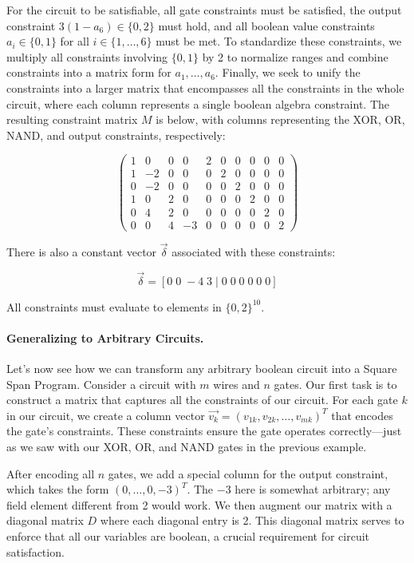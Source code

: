 \documentclass[12pt]{tufte-book}
\begin{document}
For the circuit to be satisfiable, all gate constraints must be satisfied, the output constraint $3(1 - a_6) \in \{0, 2\}$ must hold, and all boolean value constraints $a_i \in \{0, 1\}$ for all $i \in \{1,\ldots,6\}$ must be met. To standardize these constraints, we multiply all constraints involving $\{0, 1\}$ by 2 to normalize ranges and combine constraints into a matrix form for $a_1,\ldots,a_6$. Finally, we seek to unify the constraints into a larger matrix that encompasses all the constraints in the whole circuit, where each column represents a single boolean algebra constraint. The resulting constraint matrix $M$ is below, with columns representing the XOR, OR, NAND, and output constraints, respectively:

\[ \begin{pmatrix}
1 & 0 & 0 & 0 & 2 & 0 & 0 & 0 & 0 & 0 \\
1 & -2 & 0 & 0 & 0 & 2 & 0 & 0 & 0 & 0 \\
0 & -2 & 0 & 0 & 0 & 0 & 2 & 0 & 0 & 0 \\
1 & 0 & 2 & 0 & 0 & 0 & 0 & 2 & 0 & 0 \\
0 & 4 & 2 & 0 & 0 & 0 & 0 & 0 & 2 & 0 \\
0 & 0 & 4 & -3 & 0 & 0 & 0 & 0 & 0 & 2
\end{pmatrix} \]

There is also a constant vector $\vec{\delta}$ associated with these constraints:

\[ \vec{\delta} = [0 \; 0 \; -4 \; 3 \; | \; 0 \; 0 \; 0 \; 0 \; 0 \; 0] \]

All constraints must evaluate to elements in $\{0, 2\}^{10}$. 

\paragraph{Generalizing to Arbitrary Circuits.}

Let's now see how we can transform any arbitrary boolean circuit into a Square Span Program. Consider a circuit with $m$ wires and $n$ gates. Our first task is to construct a matrix that captures all the constraints of our circuit. For each gate $k$ in our circuit, we create a column vector $\vec{v_k} = (v_{1k}, v_{2k}, \ldots, v_{mk})^T$ that encodes the gate's constraints. These constraints ensure the gate operates correctly—just as we saw with our XOR, OR, and NAND gates in the previous example.

After encoding all $n$ gates, we add a special column for the output constraint, which takes the form $(0,\ldots,0,-3)^T$. The $-3$ here is somewhat arbitrary; any field element different from 2 would work. We then augment our matrix with a diagonal matrix $D$ where each diagonal entry is 2. This diagonal matrix serves to enforce that all our variables are boolean, a crucial requirement for circuit satisfaction.
\end{document}
